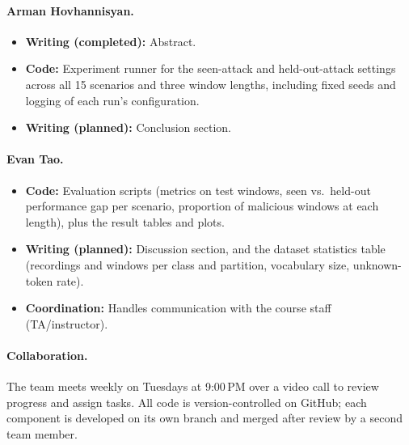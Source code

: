 \documentclass{article}
\begin{document}
    \paragraph{Arman Hovhannisyan.}
    \begin{itemize}
        \item \textbf{Writing (completed):} Abstract.
        \item \textbf{Code:} Experiment runner for the seen-attack and held-out-attack settings across all 15 scenarios and three window lengths, including fixed seeds and logging of each run's configuration.
        \item \textbf{Writing (planned):} Conclusion section.
    \end{itemize}
    
    \paragraph{Evan Tao.}
    \begin{itemize}
        \item \textbf{Code:} Evaluation scripts (metrics on test windows, seen vs.\ held-out performance gap per scenario, proportion of malicious windows at each length), plus the result tables and plots.
        \item \textbf{Writing (planned):} Discussion section, and the dataset statistics table (recordings and windows per class and partition, vocabulary size, unknown-token rate).
        \item \textbf{Coordination:} Handles communication with the course staff (TA/instructor).
    \end{itemize}

\paragraph{Collaboration.}
The team meets weekly on Tuesdays at 9:00\,PM over a video call to review progress and assign tasks. All code is version-controlled on GitHub; each component is developed on its own branch and merged after review by a second team member.
\end{document}
